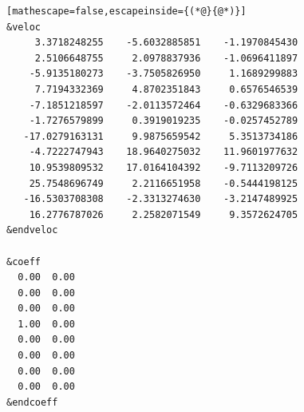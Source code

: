 \documentclass[letterpaper,12pt,titlepage]{article}
\begin{document}
\begin{appendix}
\begin{lstlisting}[mathescape=false,escapeinside={(*@}{@*)}]
&veloc
     3.3718248255    -5.6032885851    -1.1970845430
     2.5106648755     2.0978837936    -1.0696411897
    -5.9135180273    -3.7505826950     1.1689299883
     7.7194332369     4.8702351843     0.6576546539
    -7.1851218597    -2.0113572464    -0.6329683366
    -1.7276579899     0.3919019235    -0.0257452789
   -17.0279163131     9.9875659542     5.3513734186
    -4.7222747943    18.9640275032    11.9601977632
    10.9539809532    17.0164104392    -9.7113209726
    25.7548696749     2.2116651958    -0.5444198125
   -16.5303708308    -2.3313274630    -3.2147489925
    16.2776787026     2.2582071549     9.3572624705
&endveloc

&coeff
  0.00  0.00
  0.00  0.00
  0.00  0.00
  1.00  0.00
  0.00  0.00
  0.00  0.00
  0.00  0.00
  0.00  0.00
&endcoeff
\end{lstlisting}
\newpage

\end{appendix}
\end{document}
